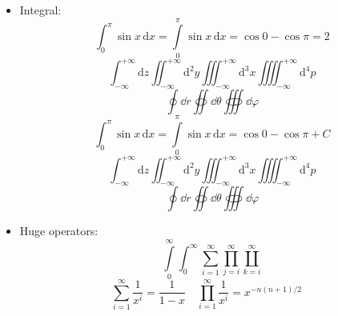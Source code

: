 \documentclass[english,log-declarations=false]{article}
\begin{document}
\begin{itemize}
  \item Integral:
        \[
            \int_0^\pi        \sin x \, \mathrm{d} x
          = \int\limits_0^\pi \sin x \, \mathrm{d} x
          = \cos 0 - \cos\pi=2
        \]
        \[
          \int_{-\infty}^{+\infty}    \mathrm{d} z
          \iint_{-\infty}^{+\infty}   \mathrm{d}^2 y
          \iiint_{-\infty}^{+\infty}  \mathrm{d}^3 x
          \iiiint_{-\infty}^{+\infty} \mathrm{d}^4 p
        \]
        \[ \oint \dd{r} \oiint \dd{\theta} \oiiint \dd{\varphi}\]
        \begingroup
          \[
              \int_0^\pi        \sin x \, \mathrm{d} x
            = \int\limits_0^\pi \sin x \, \mathrm{d} x
            = \cos 0 - \cos\pi + C
          \]
          \[
            \int_{-\infty}^{+\infty}    \mathrm{d} z
            \iint_{-\infty}^{+\infty}   \mathrm{d}^2 y
            \iiint_{-\infty}^{+\infty}  \mathrm{d}^3 x
            \iiiint_{-\infty}^{+\infty} \mathrm{d}^4 p
          \]
          \[ \oint \dd{r} \oiint \dd{\theta} \oiiint \dd{\varphi} \]
        \endgroup
  \item Huge operators:
        \[
          \int\limits_0^\infty \int_0^\infty
          \sum_{i=1}^\infty \prod_{j=i}^\infty \coprod_{k=i}^\infty
        \]
        \[
          \sum_{i=1}^\infty    \frac{1}{x^i} = \frac{1}{1-x} \quad
          \prod_{i=1}^\infty   \frac{1}{x^i} = x^{-n(n+1)/2} \quad
\]
\end{itemize}
\end{document}
